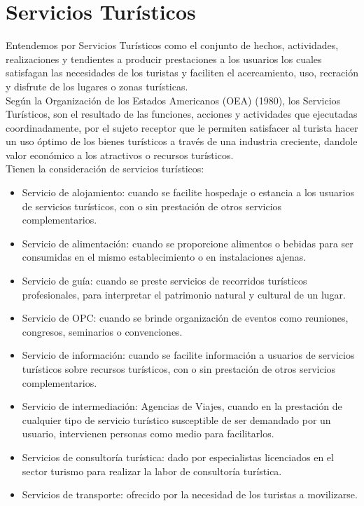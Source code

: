 \section{Servicios Turísticos}

Entendemos por Servicios Turísticos como el conjunto de hechos, actividades, realizaciones y tendientes a producir prestaciones a los usuarios los cuales   satisfagan las necesidades de los turistas y faciliten el acercamiento, uso, recración y disfrute de los lugares o zonas turísticas.\cite{ServTur} \\ 

Según la Organización de los Estados Americanos (OEA) (1980), los Servicios Turísticos, son el  resultado de las funciones, acciones y actividades que ejecutadas coordinadamente, por el sujeto receptor que le permiten satisfacer al turista hacer un uso óptimo de los bienes turísticos a través de una industria creciente, dandole valor económico a los atractivos o recursos turísticos. \cite{ServTur}\\

Tienen la consideración de servicios turísticos:\cite{ServTur}

\begin{itemize}
	\item Servicio de alojamiento: cuando se facilite hospedaje o estancia a los usuarios de servicios turísticos, con o sin prestación de otros servicios complementarios.
	
	\item Servicio de alimentación: cuando se proporcione alimentos o bebidas para ser consumidas en el mismo establecimiento o en instalaciones ajenas.
	
	\item Servicio de guía: cuando se preste servicios de recorridos turísticos profesionales, para interpretar el patrimonio natural y cultural de un lugar.
	
	\item Servicio de OPC: cuando se brinde organización de eventos como reuniones, congresos, seminarios o convenciones.
	
	\item Servicio de información: cuando se facilite información a usuarios de servicios turísticos sobre recursos turísticos, con o sin prestación de otros servicios complementarios.
	
	\item Servicio de intermediación: Agencias de Viajes, cuando en la prestación de cualquier tipo de servicio turístico susceptible de ser demandado por un usuario, intervienen personas como medio para facilitarlos.
	
	\item Servicios de consultoría turística: dado por especialistas licenciados en el sector turismo para realizar la labor de consultoría turística.
	
	\item Servicios de transporte: ofrecido por la necesidad de los turistas a movilizarse.
	
\end{itemize}